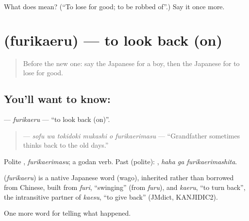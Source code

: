 \begin{tcolorbox}[breakable,colback=teal!4,colframe=teal!35!black,title={Before you move on}]
What does  mean? (\textquotedblleft{}To lose for good; to be robbed of\textquotedblright{}.) Say it once more.
\end{tcolorbox}
\section[\texorpdfstring{\ja{ふりかえる} (furikaeru)}{ふりかえる (furikaeru)}]{ (furikaeru) — to look back (on)}

\label{lesson:JA-C311-furikaeru}



\begin{quote}
Before the new one: say the Japanese for a boy, then the Japanese for to lose for good.
\end{quote}

\subsection*{You'll want to know: }
\textbf{} — \emph{furikaeru} — \textquotedblleft{}to look back (on)\textquotedblright{}.

\begin{quote}
\textbf{   } — \emph{sofu wa tokidoki mukashi o furikaerimasu} — \textquotedblleft{}Grandfather sometimes thinks back to the old days.\textquotedblright{}
\end{quote}

Polite \textbf{}, \emph{furikaerimasu}; a godan verb. Past (polite): \textbf{ }, \emph{haha ga furikaerimashita}.

\begin{cousinweb}
\textbf{} (\emph{furikaeru}) is a native Japanese word (wago), inherited rather than borrowed from Chinese, built from \emph{furi}, \textquotedblleft{}swinging\textquotedblright{} (from \emph{furu}), and \emph{kaeru}, \textquotedblleft{}to turn back\textquotedblright{}, the intransitive partner of \emph{kaesu}, \textquotedblleft{}to give back\textquotedblright{} (JMdict, KANJIDIC2).
\end{cousinweb}

\begin{grammarlens}[title={What you've built}]
One more word for telling what happened.
\end{grammarlens}

